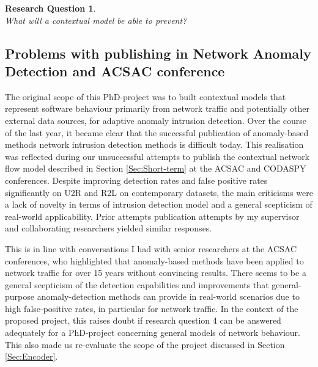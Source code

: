 \documentclass[a4paper,12pt,twoside]{article}
\newtheorem{rquestion}{Research Question}
\begin{document}
\begin{rquestion}\ \\
What will a contextual model be able to prevent? 
\end{rquestion}



\subsection{Problems with publishing in Network Anomaly Detection and ACSAC conference}\label{Sec:Problems}

The original scope of this PhD-project was to built contextual models that represent software behaviour primarily from network traffic and potentially other external data sources, for adaptive anomaly intrusion detection.  
Over the course of the last year, it became clear that the successful publication of anomaly-based methods network intrusion detection methods is difficult today. This realisation was reflected during our unsuccessful attempts to publish the contextual network flow model described in Section \ref{Sec:Short-term} at the ACSAC and CODASPY conferences. Despite improving detection rates and false positive rates significantly on U2R and R2L on contemporary datasets, the main criticisms were a lack of novelty in terms of intrusion detection model and a general scepticism of real-world applicability. Prior attempts publication attempts by my supervisor and collaborating researchers yielded similar responses.

This is in line with conversations I had with senior researchers at the ACSAC conferences, who highlighted that anomaly-based methods have been applied to network traffic for over 15 years without convincing results. There seems to be a general scepticism of the detection capabilities and improvements that general-purpose anomaly-detection methods can provide in real-world scenarios due to high false-positive rates, in particular for network traffic. In the context of the proposed project, this raises doubt if research question 4 can be answered adequately for a PhD-project concerning general models of network behaviour. This also made us re-evaluate the scope of the project discussed in Section \ref{Sec:Encoder}.
\end{document}
